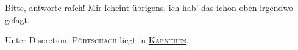 \pstart
           Bitte, antworte raſch! Mir{ }ſcheint übrigens, ich hab’ das{ }ſchon oben irgendwo
                  geſagt.\pend
           
\pstart
           Unter Discretion: \textsc{Pörtschach} liegt in \textsc{\uline{Kärnthen}}.\pend
           \endnumbering{}  \newcommand{\dateiname}{L02649}\newcommand{\titel}{Paul Goldmann an Arthur Schnitzler, 18. 8. 1890}\newcommand{\editorInnen}{Martin Anton Müller und Laura Untner}
